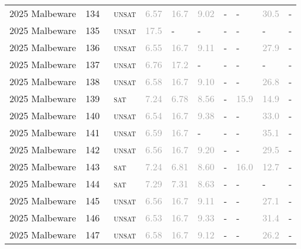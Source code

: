 \begin{center}
{\begin{longtable}{@{}llllllllll@{}}
2025 Malbeware & 134 & ~\textsc{unsat} & \textcolor{darkgray}{6.57} & \textcolor{darkgray}{16.7} & \textcolor{darkgray}{9.02} & - & - & \textcolor{darkgray}{30.5} & - \\
2025 Malbeware & 135 & ~\textsc{unsat} & \textcolor{darkgray}{17.5} & - & - & - & - & - & - \\
2025 Malbeware & 136 & ~\textsc{unsat} & \textcolor{darkgray}{6.55} & \textcolor{darkgray}{16.7} & \textcolor{darkgray}{9.11} & - & - & \textcolor{darkgray}{27.9} & - \\
2025 Malbeware & 137 & ~\textsc{unsat} & \textcolor{darkgray}{6.76} & \textcolor{darkgray}{17.2} & - & - & - & - & - \\
2025 Malbeware & 138 & ~\textsc{unsat} & \textcolor{darkgray}{6.58} & \textcolor{darkgray}{16.7} & \textcolor{darkgray}{9.10} & - & - & \textcolor{darkgray}{26.8} & - \\
2025 Malbeware & 139 & ~\textsc{sat} & \textcolor{darkgray}{7.24} & \textcolor{darkgray}{6.78} & \textcolor{darkgray}{8.56} & - & \textcolor{darkgray}{15.9} & \textcolor{darkgray}{14.9} & - \\
2025 Malbeware & 140 & ~\textsc{unsat} & \textcolor{darkgray}{6.54} & \textcolor{darkgray}{16.7} & \textcolor{darkgray}{9.38} & - & - & \textcolor{darkgray}{33.0} & - \\
2025 Malbeware & 141 & ~\textsc{unsat} & \textcolor{darkgray}{6.59} & \textcolor{darkgray}{16.7} & - & - & - & \textcolor{darkgray}{35.1} & - \\
2025 Malbeware & 142 & ~\textsc{unsat} & \textcolor{darkgray}{6.56} & \textcolor{darkgray}{16.7} & \textcolor{darkgray}{9.20} & - & - & \textcolor{darkgray}{29.5} & - \\
2025 Malbeware & 143 & ~\textsc{sat} & \textcolor{darkgray}{7.24} & \textcolor{darkgray}{6.81} & \textcolor{darkgray}{8.60} & - & \textcolor{darkgray}{16.0} & \textcolor{darkgray}{12.7} & - \\
2025 Malbeware & 144 & ~\textsc{sat} & \textcolor{darkgray}{7.29} & \textcolor{darkgray}{7.31} & \textcolor{darkgray}{8.63} & - & - & - & - \\
2025 Malbeware & 145 & ~\textsc{unsat} & \textcolor{darkgray}{6.56} & \textcolor{darkgray}{16.7} & \textcolor{darkgray}{9.11} & - & - & \textcolor{darkgray}{27.1} & - \\
2025 Malbeware & 146 & ~\textsc{unsat} & \textcolor{darkgray}{6.53} & \textcolor{darkgray}{16.7} & \textcolor{darkgray}{9.33} & - & - & \textcolor{darkgray}{31.4} & - \\
2025 Malbeware & 147 & ~\textsc{unsat} & \textcolor{darkgray}{6.58} & \textcolor{darkgray}{16.7} & \textcolor{darkgray}{9.12} & - & - & \textcolor{darkgray}{26.2} & - \\

\end{longtable}}
\end{center}
